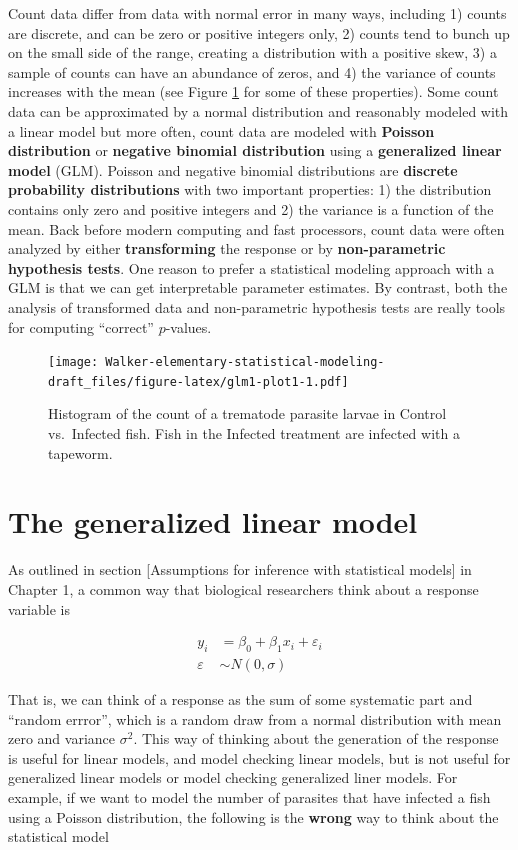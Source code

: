 \documentclass[]{book}
\begin{document}
Count data differ from data with normal error in many ways, including 1)
counts are discrete, and can be zero or positive integers only, 2)
counts tend to bunch up on the small side of the range, creating a
distribution with a positive skew, 3) a sample of counts can have an
abundance of zeros, and 4) the variance of counts increases with the
mean (see Figure \ref{fig:glm1-plot1} for some of these properties).
Some count data can be approximated by a normal distribution and
reasonably modeled with a linear model but more often, count data are
modeled with \textbf{Poisson distribution} or \textbf{negative binomial
distribution} using a \textbf{generalized linear model} (GLM). Poisson
and negative binomial distributions are \textbf{discrete probability
distributions} with two important properties: 1) the distribution
contains only zero and positive integers and 2) the variance is a
function of the mean. Back before modern computing and fast processors,
count data were often analyzed by either \textbf{transforming} the
response or by \textbf{non-parametric hypothesis tests}. One reason to
prefer a statistical modeling approach with a GLM is that we can get
interpretable parameter estimates. By contrast, both the analysis of
transformed data and non-parametric hypothesis tests are really tools
for computing ``correct'' \(p\)-values.

\begin{figure}
\centering
\texttt{[image: Walker-elementary-statistical-modeling-draft\_files/figure-latex/glm1-plot1-1.pdf]}
\caption{\label{fig:glm1-plot1}Histogram of the count of a trematode
parasite larvae in Control vs.~Infected fish. Fish in the Infected
treatment are infected with a tapeworm.}
\end{figure}

\section{The generalized linear
model}\label{the-generalized-linear-model}

As outlined in section {[}Assumptions for inference with statistical
models{]} in Chapter 1, a common way that biological researchers think
about a response variable is

\begin{align}
y_i &= \beta_0 + \beta_1 x_i + \varepsilon_i \\
\varepsilon &\sim N(0, \sigma)
\label{eq:spec1}
\end{align}

That is, we can think of a response as the sum of some systematic part
and ``random errror'', which is a random draw from a normal distribution
with mean zero and variance \(\sigma^2\). This way of thinking about the
generation of the response is useful for linear models, and model
checking linear models, but is not useful for generalized linear models
or model checking generalized liner models. For example, if we want to
model the number of parasites that have infected a fish using a Poisson
distribution, the following is the \textbf{wrong} way to think about the
statistical model
\end{document}
